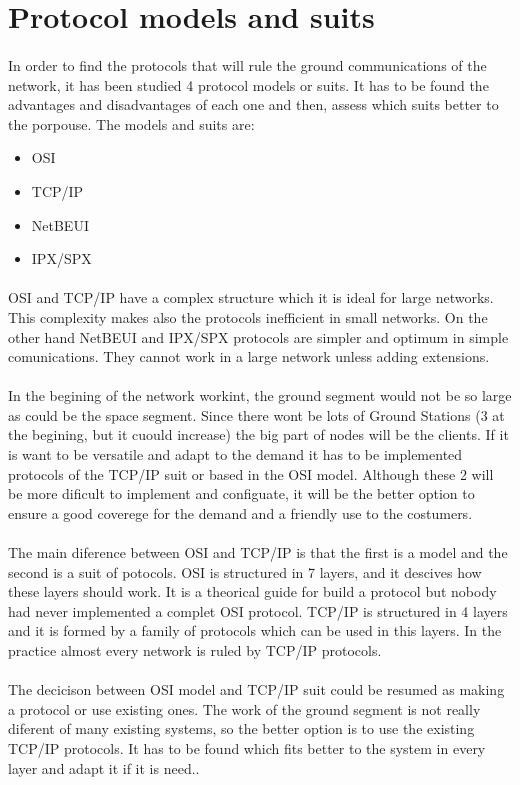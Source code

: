 \section{Protocol models and suits}
\paragraph{}
In order to find the protocols that will rule the ground communications of the network, it has been studied 4 protocol models or suits. It has to be found the advantages and disadvantages of each one and then, assess which suits better to the porpouse. The models and suits are:
\begin{itemize}
\item OSI
\item TCP/IP
\item NetBEUI
\item IPX/SPX
\end{itemize}
\paragraph{} 
OSI and TCP/IP have a complex structure which it is ideal for large networks. This complexity makes also the protocols inefficient in small networks. On the other hand NetBEUI and IPX/SPX protocols are simpler and optimum in simple comunications. They cannot work in a large network unless adding extensions. 
\paragraph{}
In the begining of the network workint, the ground segment would not be so large as could be the space segment. Since there wont be lots of Ground Stations (3 at the begining, but it cuould increase) the big part of nodes will be the clients. If it is want to be versatile and adapt to the demand it has to be implemented protocols of the TCP/IP suit or based in the OSI model. Although these 2 will be more dificult to implement and configuate, it will be the better option to ensure a good coverege for the demand and a friendly use to the costumers.
\paragraph{}
The main diference between OSI and TCP/IP is that the first is a model and the second is a suit of potocols. OSI is structured in 7 layers, and it descives how these layers should work. It is a theorical guide for build a protocol but nobody had never implemented a complet OSI protocol. TCP/IP is structured in 4 layers and it is formed by a family of protocols which can be used in this layers. In the practice almost every network is ruled by TCP/IP protocols. 
\paragraph{}
The decicison between OSI model and TCP/IP suit could be resumed as making a protocol or use existing ones. The work of the ground segment is not really diferent of many existing systems, so the better option is to use the existing TCP/IP protocols. It has to be found which fits better to the system in every layer and adapt it if it is need..

